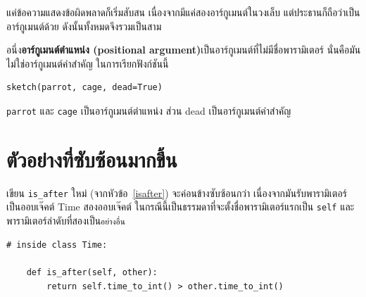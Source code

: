 แค่ข้อความแสดงข้อผิดพลาดก็เริ่มสับสน เนื่องจากมีแค่สองอาร์กูเมนต์ในวงเล็บ แต่ประธานก็ถือว่าเป็นอาร์กูเมนต์ด้วย ดังนั้นทั้งหมดจึงรวมเป็นสาม


อนึ่ง{\bf อาร์กูเมนต์ตำแหน่ง (positional argument)}เป็นอาร์กูเมนต์ที่ไม่มีชื่อพารามิเตอร์ นั่นคือมันไม่ใช่อาร์กูเมนต์คำสำคัญ ในการเรียกฟังก์ชันนี้

\begin{verbatim}
sketch(parrot, cage, dead=True)
\end{verbatim}


{\tt parrot} และ {\tt cage} เป็นอาร์กูเมนต์ตำแหน่ง ส่วน dead เป็นอาร์กูเมนต์คำสำคัญ



\section{ตัวอย่างที่ซับซ้อนมากขึ้น} %


เขียน \verb"is_after" ใหม่ (จากหัวข้อ~\ref{isafter}) จะค่อนข้างซับซ้อนกว่า เนื่องจากมันรับพารามิเตอร์เป็นออบเจ๊คต์ Time สองออบเจ๊คต์ 
ในกรณีนี้เป็นธรรมดาที่จะตั้งชื่อพารามิเตอร์แรกเป็น {\tt self} และพารามิเตอร์ลำดับที่สองเป็น{\tt อย่างอื่น}

\begin{verbatim}
# inside class Time:

    def is_after(self, other):
        return self.time_to_int() > other.time_to_int()
\end{verbatim}
%

